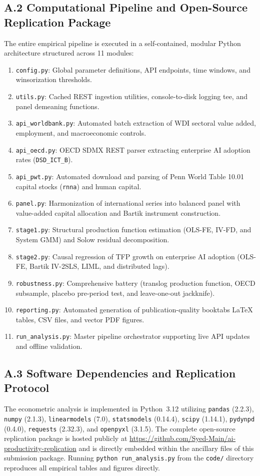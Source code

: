 \documentclass[11pt,a4paper]{article}
\begin{document}
\subsection*{A.2 Computational Pipeline and Open-Source Replication Package}
The entire empirical pipeline is executed in a self-contained, modular Python architecture structured across 11 modules:
\begin{enumerate}\setlength{\itemsep}{1pt}\setlength{\parskip}{0pt}
    \item \texttt{config.py}: Global parameter definitions, API endpoints, time windows, and winsorization thresholds.
    \item \texttt{utils.py}: Cached REST ingestion utilities, console-to-disk logging tee, and panel demeaning functions.
    \item \texttt{api\_worldbank.py}: Automated batch extraction of WDI sectoral value added, employment, and macroeconomic controls.
    \item \texttt{api\_oecd.py}: OECD SDMX REST parser extracting enterprise AI adoption rates (\texttt{DSD\_ICT\_B}).
    \item \texttt{api\_pwt.py}: Automated download and parsing of Penn World Table 10.01 capital stocks (\texttt{rnna}) and human capital.
    \item \texttt{panel.py}: Harmonization of international series into balanced panel with value-added capital allocation and Bartik instrument construction.
    \item \texttt{stage1.py}: Structural production function estimation (OLS-FE, IV-FD, and System GMM) and Solow residual decomposition.
    \item \texttt{stage2.py}: Causal regression of TFP growth on enterprise AI adoption (OLS-FE, Bartik IV-2SLS, LIML, and distributed lags).
    \item \texttt{robustness.py}: Comprehensive battery (translog production function, OECD subsample, placebo pre-period test, and leave-one-out jackknife).
    \item \texttt{reporting.py}: Automated generation of publication-quality booktabs LaTeX tables, CSV files, and vector PDF figures.
    \item \texttt{run\_analysis.py}: Master pipeline orchestrator supporting live API updates and offline validation.
\end{enumerate}

\subsection*{A.3 Software Dependencies and Replication Protocol}
The econometric analysis is implemented in Python~3.12 utilizing \texttt{pandas} (2.2.3), \texttt{numpy} (2.1.3), \texttt{linearmodels} (7.0), \texttt{statsmodels} (0.14.4), \texttt{scipy} (1.14.1), \texttt{pydynpd} (0.4.0), \texttt{requests} (2.32.3), and \texttt{openpyxl} (3.1.5). The complete open-source replication package is hosted publicly at \url{https://github.com/Syed-Main/ai-productivity-replication} and is directly embedded within the ancillary files of this submission package. Running \texttt{python run\_analysis.py} from the \texttt{code/} directory reproduces all empirical tables and figures directly.
\end{document}
